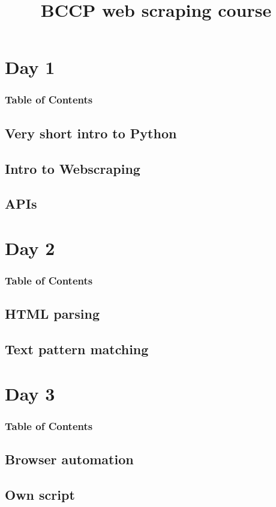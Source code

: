 \documentclass[english,aspectratio=169]{beamer}
\begin{document}
\title[Web scraping]{BCCP web scraping course}
\titlegraphic{}


\date[]{}

\begin{frame}
    \titlepage
\end{frame}

\section{Day 1}
\label{sec:day1}


\begin{frame}
    \frametitle{Table of Contents}
    \tableofcontents[currentsection]
\end{frame}

\subsection{Very short intro to Python}
\label{sec:intropython}


\subsection{Intro to Webscraping}
\label{sec:introwebscraping}



\subsection{APIs}
\label{sec:apis}


\section{Day 2}

\begin{frame}
    \frametitle{Table of Contents}
    \tableofcontents[currentsection]
\end{frame}

\subsection{HTML parsing}



\subsection{Text pattern matching}

\section{Day 3}

\begin{frame}
    \frametitle{Table of Contents}
    \tableofcontents[currentsection]
\end{frame}

\subsection{Browser automation}

\subsection{Own script}
\end{document}
